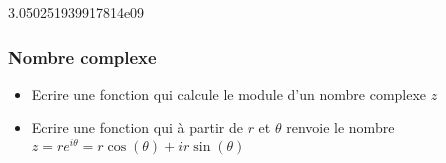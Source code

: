 \documentclass[letterpaper,10pt,english]{sphinxhowto}
\begin{document}
\begin{sphinxVerbatim}[commandchars=\\\{\}]
  
         

  
     
           
     

   
\end{sphinxVerbatim}

\begin{sphinxVerbatim}[commandchars=\\\{\}]
3.050251939917814e\PYGZhy{}09
\end{sphinxVerbatim}


\subsubsection{Nombre complexe}
\label{\detokenize{cours2_nombres_corr_exercices:nombre-complexe}}\begin{itemize}
\item {} 
\sphinxAtStartPar
Ecrire une fonction qui calcule le module d’un nombre complexe \(z\)

\item {} 
\sphinxAtStartPar
Ecrire une fonction qui à partir de \(r\) et \(\theta\) renvoie le nombre \(z = re^{i\theta} = r\cos(\theta) + ir\sin(\theta)\)

\end{itemize}



\renewcommand{\indexname}{Index}
\printindex
\end{document}
